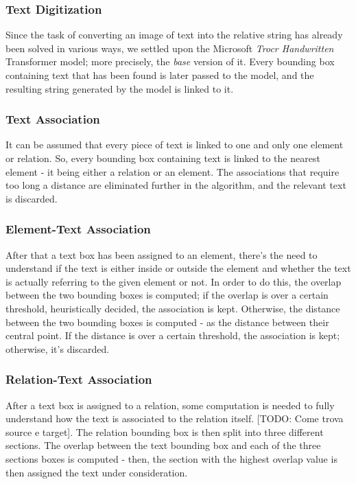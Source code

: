 \documentclass[conference]{IEEEtran}
\begin{document}
\subsubsection{Text Digitization}
Since the task of converting an image of text into the relative string has already been solved in various ways, we settled upon the Microsoft \textit{Trocr Handwritten} Transformer model; more precisely, the \textit{base} version of it. Every bounding box containing text that has been found is later passed to the model, and the resulting string generated by the model is linked to it.\\

\subsubsection{Text Association}
It can be assumed that every piece of text is linked to one and only one element or relation. So, every bounding box containing text is linked to the nearest element - it being either a relation or an element. The associations that require too long a distance are eliminated further in the algorithm, and the relevant text is discarded.\\

\subsubsection{Element-Text Association}
After that a text box has been assigned to an element, there's the need to understand if the text is either inside or outside the element and whether the text is actually referring to the given element or not. In order to do this, the overlap between the two bounding boxes is computed; if the overlap is over a certain threshold, heuristically decided, the association is kept. Otherwise, the distance between the two bounding boxes is computed - as the distance between their central point. If the distance is over a certain threshold, the association is kept; otherwise, it's discarded.\\

\subsubsection{Relation-Text Association}
After a text box is assigned to a relation, some computation is needed to fully understand how the text is associated to the relation itself. [TODO: Come trova source e target]. The relation bounding box is then split into three different sections. The overlap between the text bounding box and each of the three sections boxes is computed - then, the section with the highest overlap value is then assigned the text under consideration.
\end{document}

